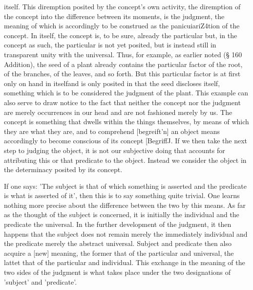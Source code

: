 itself. This diremption posited by the concept's own activity, the diremption of the
concept into the difference between its moments, is the judgment, the meaning
of which is accordingly to be construed as the panicuiariZ4tion of the concept.
In itself, the concept is, to be sure, already the particular but, in the concept as
such, the particular is not yet posited, but is instead still in transparent unity with
the universal. Thus, for example, as earlier noted (§ 160 Addition), the seed of
a plant already contains the particular factor of the root, of the branches, of the
leaves, and so forth. But this particular factor is at first only on hand in itselfand is
only posited in that the seed discloses itself, something which is to be considered
the judgment of the plant. This example can also serve to draw notice to the
fact that neither the concept nor the judgment are merely occurrences in our
head and are not fashioned merely by us. The concept is something that dwells
within the things themselves, by means of which they are what they are, and to
comprehend [begreift'n] an object means accordingly to become conscious of its
concept [BegriffJ. If we then take the next step to judging the object, it is not our
subjective doing that accounts for attributing this or that predicate to the object.
Instead we consider the object in the determinacy posited by its concept.

If one says: 'The subject is that of which something is asserted and the
predicate is what is asserted of it', then this is to say something quite trivial.
One learns nothing more precise about the difference between the two by this means.
As far as the thought of the subject is concerned, it is initially the individual and
the predicate the universal. In the further development of the judgment, it then
happens that the subject does not remain merely the immediately individual and
the predicate merely the abstract universal. Subject and predicate then also acquire
a [new] meaning, the former that of the particular and universal, the lattet that
of the particular and individual. This exchange in the meaning of the two sides
of the judgment is what takes place under the two designations of 'subject' and
'predicate'.

